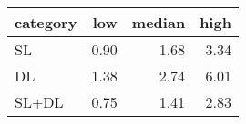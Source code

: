 \begin{tabular}{lrrr}
\hline
 category   &   low &   median &   high \\
\hline
 SL         &  0.90 &     1.68 &   3.34 \\
 DL         &  1.38 &     2.74 &   6.01 \\
 SL+DL      &  0.75 &     1.41 &   2.83 \\
\hline
\end{tabular}